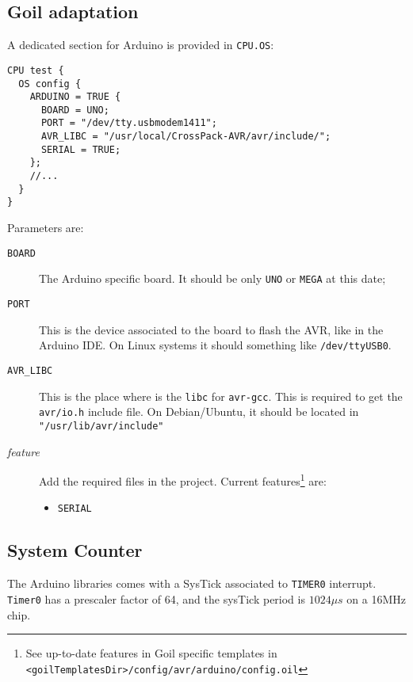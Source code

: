 \subsection{Goil adaptation}
A dedicated section for Arduino is provided in  \texttt{CPU.OS}:
\begin{lstlisting}[language=OIL]
CPU test {    
  OS config {
    ARDUINO = TRUE {
      BOARD = UNO;
      PORT = "/dev/tty.usbmodem1411";
      AVR_LIBC = "/usr/local/CrossPack-AVR/avr/include/";
      SERIAL = TRUE;
    };
    //...
  }
}
\end{lstlisting}

Parameters are:
\begin{description}
\item[\texttt{BOARD}] The Arduino specific board. It should be only \texttt{UNO} or \texttt{MEGA} at this date;
\item[\texttt{PORT}] This is the device associated to the board to flash the AVR, like in the Arduino IDE. On Linux systems it should something like \texttt{/dev/ttyUSB0}.
\item[\texttt{AVR\_LIBC}] This is the place where is the \texttt{libc} for \texttt{avr-gcc}. This is required to get the \texttt{avr/io.h} include file. On Debian/Ubuntu, it should be located in \texttt{"/usr/lib/avr/include"}
\item[\textit{feature}] Add the required files in the project. Current features\footnote{See up-to-date features in Goil specific templates in \texttt{<goilTemplatesDir>/config/avr/arduino/config.oil}} are:
\begin{itemize}
\item \texttt{SERIAL}
\end{itemize}
\end{description}

\subsection{System Counter}
The Arduino libraries comes with a SysTick associated to \texttt{TIMER0} interrupt. \texttt{Timer0} has a prescaler factor of 64, and the sysTick period is \textbf{$1024\mu s$} on a 16MHz chip.

